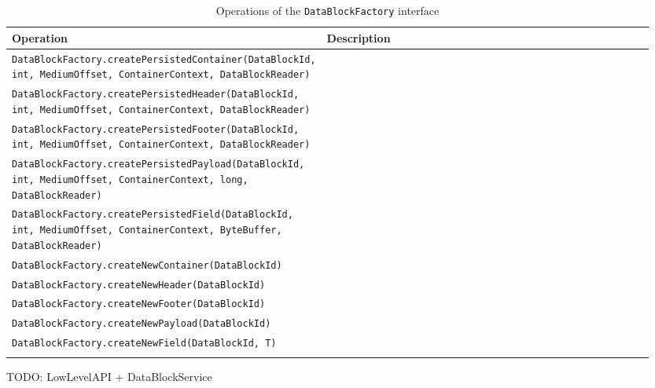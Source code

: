 \small
\begin{landscape}
\begin{longtable}{|p{0.3\linewidth}|p{0.65\linewidth}|}
\hline
\rowcolor[gray]{.9}\textbf{Operation} & \textbf{Description} \\
\endhead
\hline
\texttt{DataBlockFactory.}\texttt{createPersistedContainer(DataBlockId, int, MediumOffset, ContainerContext, DataBlockReader)} &  \\
\hline
\texttt{DataBlockFactory.}\texttt{createPersistedHeader(DataBlockId, int, MediumOffset, ContainerContext, DataBlockReader)} &  \\
\hline
\texttt{DataBlockFactory.}\texttt{createPersistedFooter(DataBlockId, int, MediumOffset, ContainerContext, DataBlockReader)} &  \\
\hline
\texttt{DataBlockFactory.}\texttt{createPersistedPayload(DataBlockId, int, MediumOffset, ContainerContext, long, DataBlockReader)} &  \\
\hline
\texttt{DataBlockFactory.}\texttt{createPersistedField(DataBlockId, int, MediumOffset, ContainerContext, ByteBuffer, DataBlockReader)} &  \\
\hline
\texttt{DataBlockFactory.}\texttt{createNewContainer(DataBlockId)} &  \\
\hline
\texttt{DataBlockFactory.}\texttt{createNewHeader(DataBlockId)} &  \\
\hline
\texttt{DataBlockFactory.}\texttt{createNewFooter(DataBlockId)} &  \\
\hline
\texttt{DataBlockFactory.}\texttt{createNewPayload(DataBlockId)} &  \\
\hline
\texttt{DataBlockFactory.}\texttt{createNewField(DataBlockId, T)} &  \\
\hline
\caption{Operations of the \texttt{DataBlockFactory} interface}
\label{tab:DBOpsDataBlockFactory}
\end{longtable}
\end{landscape}
\normalsize

TODO: LowLevelAPI + DataBlockService

%
%

